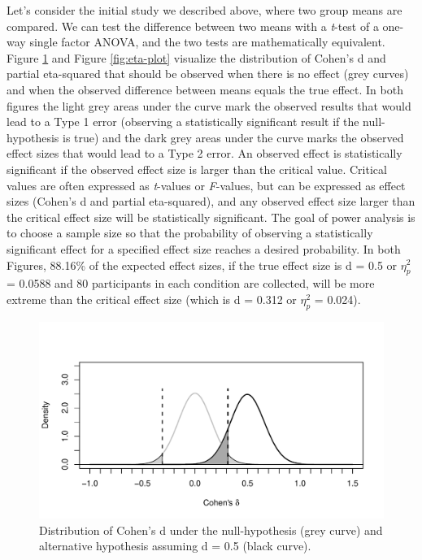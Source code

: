 \documentclass[,jou, draftfirst, a4paper,floatsintext]{apa6}
\begin{document}
Let's consider the initial study we described above, where two group means are compared.
We can test the difference between two means with a \emph{t}-test of a one-way single factor ANOVA, and the two tests are mathematically equivalent.
Figure \ref{fig:d-plot} and Figure \ref{fig:eta-plot} visualize the distribution of Cohen's d and partial eta-squared that should be observed when there is no effect (grey curves) and when the observed difference between means equals the true effect.
In both figures the light grey areas under the curve mark the observed results that would lead to a Type 1 error (observing a statistically significant result if the null-hypothesis is true) and the dark grey areas under the curve marks the observed effect sizes that would lead to a Type 2 error.
An observed effect is statistically significant if the observed effect size is larger than the critical value.
Critical values are often expressed as \emph{t}-values or \emph{F}-values, but can be expressed as effect sizes (Cohen's d and partial eta-squared), and any observed effect size larger than the critical effect size will be statistically significant.
The goal of power analysis is to choose a sample size so that the probability of observing a statistically significant effect for a specified effect size reaches a desired probability.
In both Figures, 88.16\% of the expected effect sizes, if the true effect size is d = 0.5 or \(\eta_p^2\) = 0.0588 and 80 participants in each condition are collected, will be more extreme than the critical effect size (which is d = 0.312 or \(\eta_p^2\) = 0.024).

\begin{figure}
\centering
\includegraphics{0.1_Simulation_Based_Power_Analysis_For_Factorial_ANOVA_Designs_files/figure-latex/d-plot-1.pdf}
\caption{\label{fig:d-plot}Distribution of Cohen's d under the null-hypothesis (grey curve) and alternative hypothesis assuming d = 0.5 (black curve).}
\end{figure}
\end{document}
